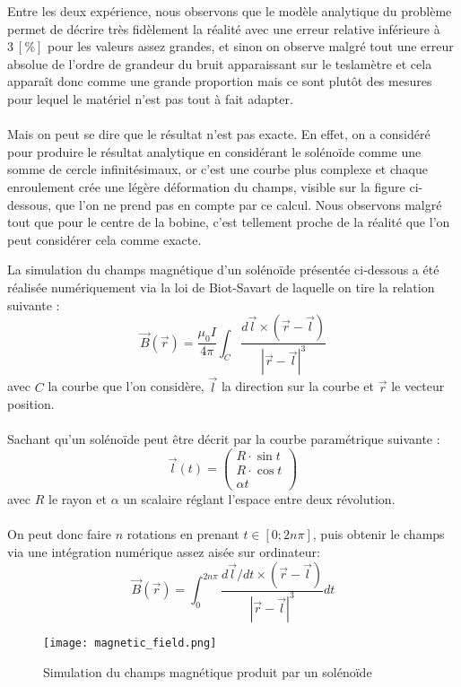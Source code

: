 Entre les deux expérience, nous observons que le modèle analytique du problème permet de décrire très fidèlement la réalité avec une erreur relative inférieure à $3 \ [\%]$ pour les valeurs assez grandes, et sinon on observe malgré tout une erreur absolue de l'ordre de grandeur du bruit apparaissant sur le teslamètre et cela apparaît donc comme une grande proportion mais ce sont plutôt des mesures pour lequel le matériel n'est pas tout à fait adapter.\\ \\
Mais on peut se dire que le résultat n'est pas exacte. En effet, on a considéré pour produire le résultat analytique en considérant le solénoïde comme une somme de cercle infinitésimaux, or c'est une courbe plus complexe et chaque enroulement crée une légère déformation du champs, visible sur la figure ci-dessous, que l'on ne prend pas en compte par ce calcul. Nous observons malgré tout que pour le centre de la bobine, c'est tellement proche de la réalité que l'on peut considérer cela comme exacte.\\

\begin{invsummary}
La simulation du champs magnétique d'un solénoïde présentée ci-dessous a été réalisée numériquement via la loi de Biot-Savart de laquelle on tire la relation suivante :
$$\vec{B}(\vec{r}) =  \frac{\mu_0 I}{4 \pi} \int_C \frac{d\vec{l} \times (\vec{r}-\vec{l})}{|\vec{r}-\vec{l}|^3} $$
avec $C$ la courbe que l'on considère, $\vec{l}$ la direction sur la courbe et $\vec{r}$ le vecteur position.\\ \\
Sachant qu'un solénoïde peut être décrit par la courbe paramétrique suivante :
$$ \vec{l}(t) = \begin{pmatrix}
R \cdot \sin t \\
R \cdot \cos t \\
\alpha t
\end{pmatrix} $$
avec $R$ le rayon et $\alpha$ un scalaire réglant l'espace entre deux révolution.\\ \\
On peut donc faire $n$ rotations en prenant $t \in \left[0 ; 2 n \pi \right]$, puis obtenir le champs via une intégration numérique assez aisée sur ordinateur\footnotemark :
$$\vec{B}(\vec{r}) = \int_0^{2 n \pi} \frac{d\vec{l}/dt \times (\vec{r} - \vec{l})}{|\vec{r}-\vec{l}|^3} dt$$
\end{invsummary} 
\begin{figure}[H]
\centering
\texttt{[image: magnetic\_field.png]}

\caption{Simulation du champs magnétique produit par un solénoïde}
\end{figure}
